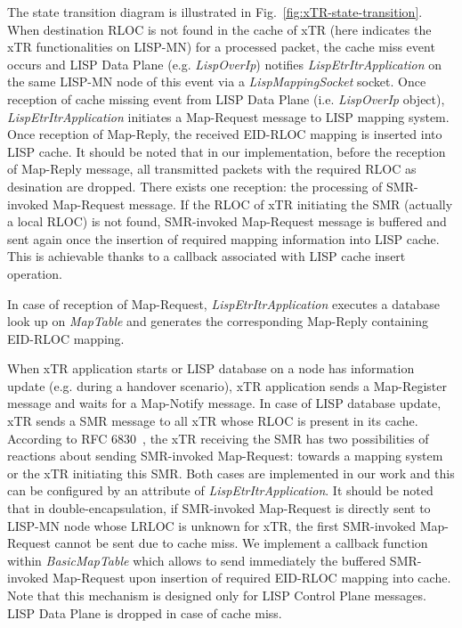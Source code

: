 The state transition diagram is illustrated in Fig.~\ref{fig:xTR-state-transition}. When destination RLOC is not found in the cache of xTR (here indicates the xTR functionalities on LISP-MN) for a processed packet, the cache miss event occurs and LISP Data Plane (e.g. \emph{LispOverIp}) notifies \emph{LispEtrItrApplication} on the same LISP-MN node of this event via a \emph{LispMappingSocket} socket. Once reception of cache missing event from LISP Data Plane (i.e. \emph{LispOverIp} object), \emph{LispEtrItrApplication} initiates a Map-Request message to LISP mapping system. Once reception of Map-Reply, the received EID-RLOC mapping is inserted into LISP cache. It should be noted that in our implementation, before the reception of Map-Reply message, all transmitted packets with the required RLOC as desination are dropped. There exists one reception: the processing of SMR-invoked Map-Request message. If the RLOC of xTR initiating the SMR (actually a local RLOC) is not found, SMR-invoked Map-Request message is buffered and sent again once the insertion of required mapping information into LISP cache. This is achievable thanks to a callback associated with LISP cache insert operation.

In case of reception of Map-Request, \emph{LispEtrItrApplication} executes a database look up on \emph{MapTable} and generates the corresponding Map-Reply containing EID-RLOC mapping.

When xTR application starts or LISP database on a node has information update (e.g. during a handover scenario), xTR application sends a Map-Register message and waits for a Map-Notify message. In case of LISP database update, xTR sends a SMR message to all xTR whose RLOC is present in its cache. %
According to RFC 6830~\cite{rfc6830}, the xTR receiving the SMR has two possibilities of reactions about sending SMR-invoked Map-Request:  towards a mapping system or the xTR initiating this SMR. Both cases are implemented in our work and this can be configured by an attribute of \emph{LispEtrItrApplication}. It should be noted that in double-encapsulation, if SMR-invoked Map-Request is directly sent to LISP-MN node whose LRLOC is unknown for xTR, the first SMR-invoked Map-Request cannot be sent due to cache miss. We implement a callback function within \emph{BasicMapTable} which allows to send immediately the buffered SMR-invoked Map-Request upon insertion of required EID-RLOC mapping into cache. Note that this mechanism is designed only for LISP Control Plane messages. LISP Data Plane is dropped in case of cache miss.

